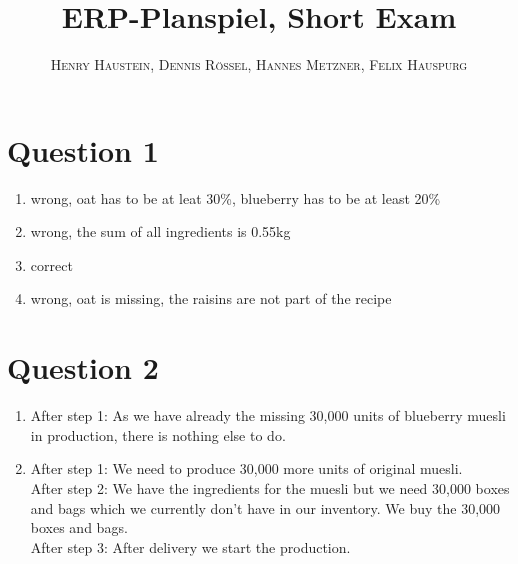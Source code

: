 \documentclass{article}
\title{\textbf{ERP-Planspiel, Short Exam}}
\author{\textsc{Henry Haustein}, \textsc{Dennis Rössel}, \textsc{Hannes Metzner}, \textsc{Felix Hauspurg}}
\date{}
\begin{document}
	\maketitle
	
	\section*{Question 1}
	\begin{enumerate}[label=(\alph*)]
		\item wrong, oat has to be at leat 30\%, blueberry has to be at least 20\%
		\item wrong, the sum of all ingredients is 0.55kg
		\item correct
		\item wrong, oat is missing, the raisins are not part of the recipe
	\end{enumerate}

	\section*{Question 2}
	\begin{enumerate}[label=(\alph*)]
		\item After step 1: As we have already the missing 30,000 units of blueberry muesli in production, there is nothing else to do.
		\item After step 1: We need to produce 30,000 more units of original muesli. \\
		After step 2: We have the ingredients for the muesli but we need 30,000 boxes and bags which we currently don't have in our inventory. We buy the 30,000 boxes and bags. \\
		After step 3: After delivery we start the production.
	\end{enumerate}
	
\end{document}
